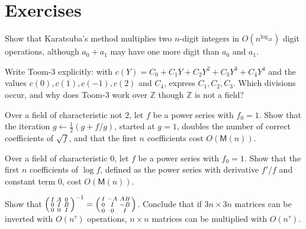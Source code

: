 \section{Exercises}

\begin{exercise}[$\star$]\label{ex:karatsubaint}
Show that Karatsuba's method multiplies two $n$-digit integers in $O(n^{\log_23})$ digit operations, although $a_0+a_1$ may have one more digit than $a_0$ and $a_1$.
\end{exercise}

\begin{exercise}[$\star\star$]\label{ex:toom3}
Write Toom-$3$ explicitly: with $c(Y)=C_0+C_1Y+C_2Y^2+C_3Y^3+C_4Y^4$ and the values $c(0),c(1),c(-1),c(2)$ and $C_4$, express $C_1,C_2,C_3$. Which divisions occur, and why does Toom-$3$ work over $\mathbb Z$ though $\mathbb Z$ is not a field?
\end{exercise}

\begin{exercise}[$\star\star$]\label{ex:sqrtnewton}
Over a field of characteristic not $2$, let $f$ be a power series with $f_0=1$. Show that the iteration $g\leftarrow\frac12(g+f/g)$, started at $g=1$, doubles the number of correct coefficients of $\sqrt f$, and that the first $n$ coefficients cost $O(\mathsf M(n))$.
\end{exercise}

\begin{exercise}[$\star$]\label{ex:logseries}
Over a field of characteristic $0$, let $f$ be a power series with $f_0=1$. Show that the first $n$ coefficients of $\log f$, defined as the power series with derivative $f'/f$ and constant term $0$, cost $O(\mathsf M(n))$.
\end{exercise}

\begin{exercise}[$\star$]\label{ex:mulviainv}
Show that $\begin{psmallmatrix}I&A&0\\0&I&B\\0&0&I\end{psmallmatrix}^{-1}=\begin{psmallmatrix}I&-A&AB\\0&I&-B\\0&0&I\end{psmallmatrix}$. Conclude that if $3n\times3n$ matrices can be inverted with $O(n^\tau)$ operations, $n\times n$ matrices can be multiplied with $O(n^\tau)$.
\end{exercise}

